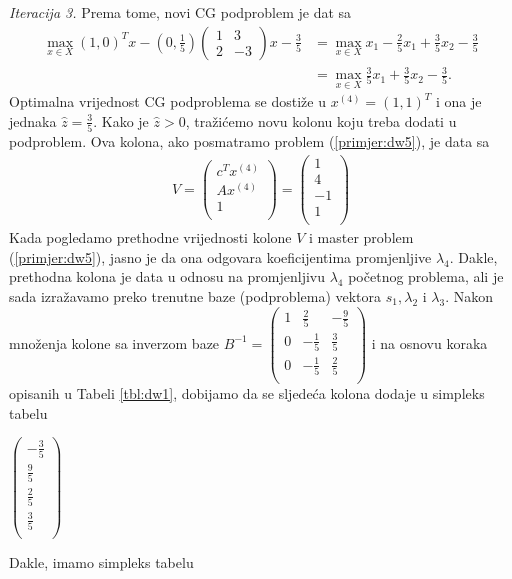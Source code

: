 \documentclass[b5paper, utf8, 11pt, colorlinks]{book}
\theoremstyle{definition}
\begin{document}
  
  \vspace{5mm}
   \emph{Iteracija 3.} Prema tome, novi CG podproblem je dat sa 
  \begin{align*}
        \max_{x \in X} (1, 0)^T x - (0, \frac{1}{5})\left(\begin{array}{cc}
       	1 & 3 \\
       	2 & -3
       \end{array}\right)  x   - \frac{3}{5} &= \max_{x \in X}x_1  - \frac{2}{5}x_1 + \frac{3}{5}x_2 - \frac{3}{5} \\
       &= \max_{x \in X} \frac{3}{5}x_1 + \frac{3}{5}x_2 - \frac{3}{5}.
  \end{align*} 
Optimalna vrijednost CG podproblema se dostiže u $x^{(4)} = (1, 1)^T$ i ona je jednaka $\hat{z}=\frac{3}{5}$. Kako je $\hat{z}>0$, tražićemo novu kolonu koju treba dodati u podproblem. Ova kolona, ako posmatramo problem (\ref{primjer:dw5}), je   data sa 
\begin{align}
	V =   \begin{pmatrix}
		c^T x^{(4)}\\
		A x^{(4)}  \\
		1     \\
	\end{pmatrix} = \begin{pmatrix}
		1 \\
		4  \\
		-1  \\
		1\\  
	\end{pmatrix}
\end{align}
Kada pogledamo prethodne vrijednosti kolone $V$ i master problem (\ref{primjer:dw5}), jasno je da ona odgovara koeficijentima promjenljive $\lambda_4$. Dakle, prethodna kolona je data u odnosu na promjenljivu $\lambda_4$ početnog problema, ali je sada izražavamo preko trenutne baze (podproblema) vektora $s_1, \lambda_2$ i $\lambda_3$.  Nakon množenja kolone sa inverzom baze 
$B^{-1}= 
\begin{pmatrix}
	 1 &  \frac{2}{5}   & -\frac{9}{5} \\
	 0 &  -\frac{1}{5}  & \frac{3}{5}  \\
	 0 &  -\frac{1}{5}  & \frac{2}{5}  \\ 
\end{pmatrix} $ i na osnovu koraka opisanih u Tabeli \ref{tbl:dw1}, dobijamo da se sljedeća kolona dodaje u simpleks tabelu

\begin{center}
	
	$\begin{pmatrix}
		-\frac{3}{5}            \\
		\frac{9}{5}     \\
		 \frac{2}{5}       \\
		\frac{3}{5}    \\
	\end{pmatrix}$
\end{center}
Dakle, imamo simpleks tabelu 
\end{document}
